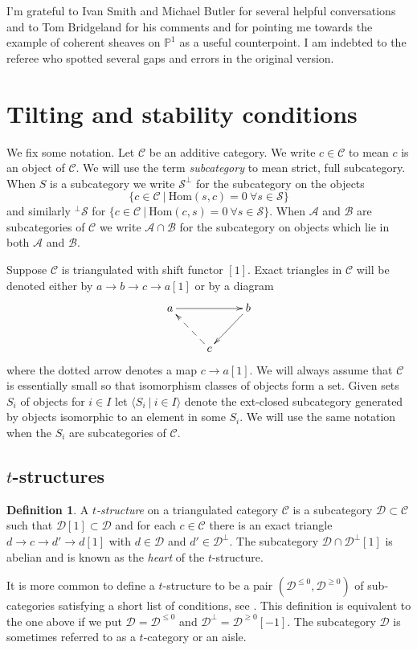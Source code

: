 \documentclass{article}
\theoremstyle{plain}
\theoremstyle{definition}
\newtheorem{definition}[theorem]{Definition}
\theoremstyle{remark}
\newcommand{\defn}[1]{\emph{#1}}
\renewcommand{\P}{\mathbb{P}}
\newcommand{\cat}[1]{\mathcal{#1}}
\newcommand{\mor}[2]{{\mathrm{Hom}}(#1,#2)}
\begin{document}
I'm grateful to Ivan Smith and Michael Butler for several helpful conversations and to Tom Bridgeland for his comments and for pointing me towards the example of coherent sheaves on $\P^1$ as a useful counterpoint. I am indebted to the referee who spotted several gaps and errors in the original version. 


\section{Tilting and stability conditions}
\label{theory}


We fix some notation. Let $\cat{C}$ be an additive category. We write $c\in \cat{C}$ to mean $c$ is an object of $\cat{C}$. We will use the term \defn{subcategory} to mean strict, full subcategory. When $S$ is a subcategory we write $\cat{S}^\perp$ for the subcategory on the objects 
$$
\{ c \in \cat{C} \ | \ \mor{s}{c} = 0 \ \forall s \in \cat{S} \}
$$
and similarly ${}^\perp\cat{S}$ for $\{ c \in \cat{C} \ | \ \mor{c}{s} = 0 \ \forall s \in \cat{S} \}$. When $\cat{A}$ and $\cat{B}$ are subcategories of $\cat{C}$ we write $\cat{A}\cap \cat{B}$ for the subcategory on objects which lie in both $\cat{A}$ and $\cat{B}$.

Suppose $\cat{C}$ is triangulated with shift functor $[1]$. Exact triangles in $\cat{C}$ will be denoted either by $a\to b\to c \to a[1]$ or by a diagram
$$
\xymatrix{
a \ar[rr] && b \ar[dl] \\
& c \ar@{-->}[ul] & 
}
$$
where the dotted arrow denotes a map $c \to a[1]$. We will always assume that $\cat{C}$ is essentially small so that isomorphism classes of objects form a set. Given sets $S_i$ of objects for $i\in I$  let $\langle S_i\ |\ i\in I \rangle$ denote the ext-closed subcategory generated by objects isomorphic to an element  in some $S_i$. We will use the same notation when the $S_i$ are subcategories of $\cat{C}$. 

\subsection{$t$-structures}
\label{torsion theories}

\begin{definition}
A \defn{$t$-structure} on a triangulated category $\cat{C}$ is a subcategory $\cat{D}\subset \cat{C}$ such that $\cat{D}[1] \subset \cat{D}$ and for each $c\in \cat{C}$ there is an exact triangle $d \to c \to d' \to d[1]$ with $d \in \cat{D}$ and $d'\in \cat{D}^\perp$. The subcategory $\cat{D} \cap \cat{D}^\perp[1]$ is abelian \cite[Th\'eor\`eme 1.3.6]{bbd} and is known as the \defn{heart} of the $t$-structure.
\end{definition}
 It is more common to define a $t$-structure to be a pair $(\cat{D}^{\leq 0}, \cat{D}^{\geq0})$ of sub-categories satisfying a short list of conditions, see \cite[\S1.3]{bbd}. This definition is equivalent to the one above if we put $\cat{D} = \cat{D}^{\leq 0}$ and $\cat{D}^\perp = \cat{D}^{\geq 0}[-1]$. The subcategory $\cat{D}$ is sometimes referred to as a $t$-category or an aisle. 
 
\end{document}
